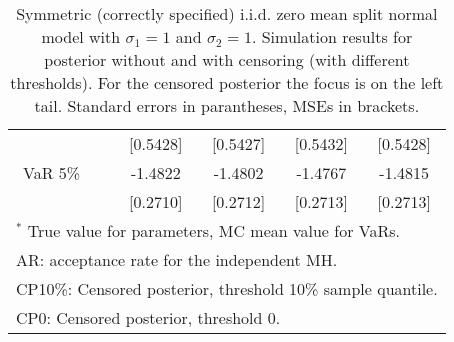 {\begin{table}
\begin{tabular}{cc cccc}
  && [0.5428] & [0.5427] & [0.5432] & [0.5428]  \\ 
VaR 5\% && -1.4822 & -1.4802 & -1.4767 & -1.4815  \\ 
 && [0.2710] & [0.2712] & [0.2713] & [0.2713]  \\ 
\hline 
\multicolumn{6}{l}{\footnotesize{$^*$ True value for parameters, MC mean value for VaRs.}}  \\ 
\multicolumn{6}{l}{\footnotesize{AR: acceptance rate for the independent MH.}}  \\ 
\multicolumn{6}{l}{\footnotesize{CP10\%: Censored posterior, threshold 10\% sample quantile.}}  \\ 
\multicolumn{6}{l}{\footnotesize{CP0: Censored posterior, threshold 0.}} 
\end{tabular}
 \caption{Symmetric (correctly specified) i.i.d. zero mean split normal model with $\sigma_{1} = 1$ and $\sigma_{2} = 1$. Simulation results for posterior without and with censoring (with different thresholds). For the censored posterior the focus is on the left tail. Standard errors in parantheses, MSEs in brackets.} 
\label{tab:iid}  
\end{table}
}